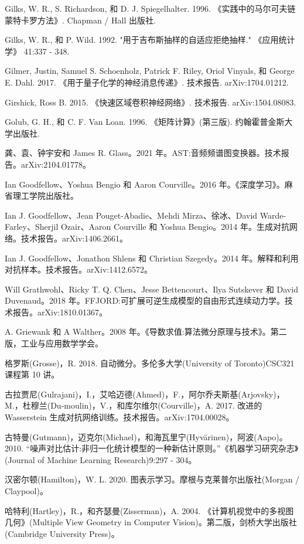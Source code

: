 \documentclass[10pt]{report}
\begin{document}
Gilks, W. R., S. Richardson, 和 D. J. Spiegelhalter. 1996. 《实践中的马尔可夫链蒙特卡罗方法》. Chapman / Hall 出版社.

Gilks, W. R., 和 P. Wild. 1992. "用于吉布斯抽样的自适应拒绝抽样." 《应用统计学》 41:337 - 348.

Gilmer, Justin, Samuel S. Schoenholz, Patrick F. Riley, Oriol Vinyals, 和 George E. Dahl. 2017. 《用于量子化学的神经消息传递》. 技术报告. arXiv:1704.01212.

Girshick, Ross B. 2015. 《快速区域卷积神经网络》. 技术报告. arXiv:1504.08083.

Golub, G. H., 和 C. F. Van Loan. 1996. 《矩阵计算》(第三版). 约翰霍普金斯大学出版社.

龚、袁、钟宇安和 James R. Glass。2021 年。AST:音频频谱图变换器。技术报告。arXiv:2104.01778。

Ian Goodfellow、Yoshua Bengio 和 Aaron Courville。2016 年。《深度学习》。麻省理工学院出版社。

Ian J. Goodfellow、Jean Pouget-Abadie、Mehdi Mirza、徐冰、David Warde-Farley、Sherjil Ozair、Aaron Courville 和 Yoshua Bengio。2014 年。生成对抗网络。技术报告。arXiv:1406.2661。

Ian J. Goodfellow、Jonathon Shlens 和 Christian Szegedy。2014 年。解释和利用对抗样本。技术报告。arXiv:1412.6572。

Will Grathwohl、Ricky T. Q. Chen、Jesse Bettencourt、Ilya Sutskever 和 David Duvenaud。2018 年。FFJORD:可扩展可逆生成模型的自由形式连续动力学。技术报告。arXiv:1810.01367。

A. Griewank 和 A Walther。2008 年。《导数求值:算法微分原理与技术》。第二版，工业与应用数学学会。

格罗斯(Grosse)，R. 2018. 自动微分。多伦多大学(University of Toronto)CSC321 课程第 10 讲。

古拉贾尼(Gulrajani)，I.，艾哈迈德(Ahmed)，F.，阿尔乔夫斯基(Arjovsky)，M.，杜穆兰(Du-moulin)，V.，和库尔维尔(Courville)，A. 2017. 改进的 Wasserstein 生成对抗网络训练。技术报告。arXiv:1704.00028。

古特曼(Gutmann)，迈克尔(Michael)，和海瓦里宁(Hyvärinen)，阿波(Aapo)。2010. “噪声对比估计:非归一化统计模型的一种新估计原则。”《机器学习研究杂志》(Journal of Machine Learning Research)9:297 - 304。

汉密尔顿(Hamilton)，W. L. 2020. 图表示学习。摩根与克莱普尔出版社(Morgan / Claypool)。

哈特利(Hartley)，R.，和齐瑟曼(Zisserman)，A. 2004. 《计算机视觉中的多视图几何》(Multiple View Geometry in Computer Vision)。第二版，剑桥大学出版社(Cambridge University Press)。
\end{document}
